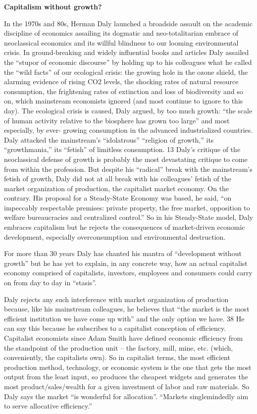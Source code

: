 \documentclass[
]{book}
\begin{document}
\textbf{Capitalism without growth?}

In the 1970s and 80s, Herman Daly launched a broadside assault on the academic
discipline of economics assailing its dogmatic and neo-totalitarian embrace of
neoclassical economics and its willful blindness to our looming environmental
crisis. In ground-breaking and widely influential books and articles Daly assailed the
``stupor of economic discourse'' by holding up to his colleagues what he called the
``wild facts'' of our ecological crisis: the growing hole in the ozone shield, the
alarming evidence of rising CO2 levels, the shocking rates of natural resource
consumption, the frightening rates of extinction and loss of biodiversity and so on,
which mainstream economists ignored (and most continue to ignore to this day). The
ecological crisis is caused, Daly argued, by too much growth: ``the scale of human
activity relative to the biosphere has grown too large'' and most especially, by ever-
growing consumption in the advanced industrialized countries. Daly attacked the
mainstream's ``idolatrous'' ``religion of growth,'' its ``growthmania,'' its ``fetish'' of
limitless consumption. 13 Daly's critique of the neoclassical defense of growth is
probably the most devastating critique to come from within the profession.
But despite his ``radical'' break with the mainstream's fetish of growth, Daly did not
at all break with his colleagues' fetish of the market organization of production, the
capitalist market economy. On the contrary. His proposal for a Steady-State
Economy was based, he said, ``on impeccably respectable premises: private
property, the free market, opposition to welfare bureaucracies and centralized
control.'' So in his Steady-State model, Daly embraces capitalism but he rejects the
consequences of market-driven economic development, especially overconsumption
and environmental destruction.

For more than 30 years Daly has chanted his mantra of ``development without
growth'' but he has yet to explain, in any concrete way, how an actual capitalist
economy comprised of capitalists, investors, employees and consumers could carry
on from day to day in ``stasis''.

Daly rejects any such interference with market organization of production because,
like his mainstream colleagues, he believes that ``the market is the most efficient
institution we have come up with'' and the only option we have. 38 He can say this
because he subscribes to a capitalist conception of efficiency. Capitalist economists
since Adam Smith have defined economic efficiency from the standpoint of the
production unit -- the factory, mill, mine, etc. (which, conveniently, the capitalists
own). So in capitalist terms, the most efficient production method, technology, or
economic system is the one that gets the most output from the least input, so
produces the cheapest widgets and generates the most product/sales/wealth for a
given investment of labor and raw materials. So Daly says the market ``is wonderful
for allocation''. ``Markets singlemindedly aim to serve allocative efficiency.''
\end{document}
